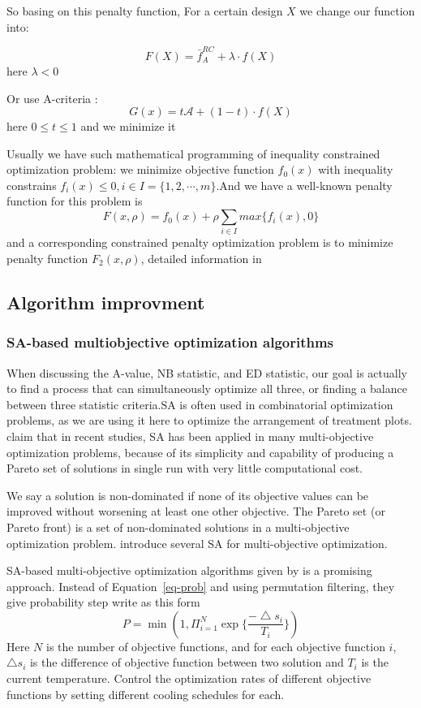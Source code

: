 \documentclass[
  a4paper,
  oneside,
  openany,
  12pt,
  onecolumn]{book}
\theoremstyle{definition}
\theoremstyle{plain}
\theoremstyle{remark}
\begin{document}
So basing on this penalty function, For a certain design \(X\) we change
our function into:

\[
F(X) = \bar{f}_A^{RC} + \lambda \cdot f(X)
\] here \(\lambda < 0\)

Or use A-criteria : \[
G(x) = t\mathcal{A} + (1-t)\cdot f(X)
\] here \(0\leq t \leq 1\) and we minimize it

Usually we have such mathematical programming of inequality constrained
optimization problem: we minimize objective function \(f_0(x)\) with
inequality constrains \(f_i(x)\leq 0, i\in I=\{1,2,\cdots,m\}\).And we
have a well-known penalty function for this problem is \[
F (x, \rho) = f_0(x) + \rho \sum_{i\in I}max\{f_i(x),0\}
\] and a corresponding constrained penalty optimization problem is to
minimize penalty function \(F_2 (x, \rho)\), detailed information in
\citet{meng2013exactness}

\subsection{Algorithm improvment}\label{algorithm-improvment}

\subsubsection{SA-based multiobjective optimization
algorithms}\label{sa-based-multiobjective-optimization-algorithms}

When discussing the A-value, NB statistic, and ED statistic, our goal is
actually to find a process that can simultaneously optimize all three,
or finding a balance between three statistic criteria.SA is often used
in combinatorial optimization problems, as we are using it here to
optimize the arrangement of treatment plots. \citet{suman2006survey}
claim that in recent studies, SA has been applied in many
multi-objective optimization problems, because of its simplicity and
capability of producing a Pareto set of solutions in single run with
very little computational cost.

We say a solution is non-dominated if none of its objective values can
be improved without worsening at least one other objective. The Pareto
set (or Pareto front) is a set of non-dominated solutions in a
multi-objective optimization problem. \citet{suman2006survey} introduce
several SA for multi-objective optimization.

SA-based multi-objective optimization algorithms given by
\citet{suppapitnarm2000simulated} is a promising approach. Instead of
Equation~\ref{eq-prob} and using permutation filtering, they give
probability step write as this form \[
P = \min(1, \Pi_{i=1}^N\exp\{\frac{-\bigtriangleup s_i}{T_i}\})
\] Here \(N\) is the number of objective functions, and for each
objective function \(i\), \(\bigtriangleup s_i\) is the difference of
objective function between two solution and \(T_i\) is the current
temperature. Control the optimization rates of different objective
functions by setting different cooling schedules for each.
\end{document}
